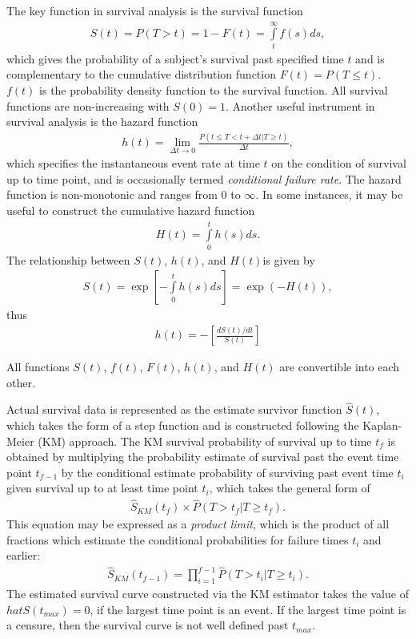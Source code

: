\documentclass[main.tex]{subfiles}
\begin{document}
The key function in survival analysis is the survival function
\begin{align}
S(t)=P(T>t) = 1-F(t) = \int\limits_t^\infty f(s)ds,
\end{align}
which gives the probability of a subject's survival past specified time $t$ and is complementary to the cumulative distribution function $F(t)=P(T \leq t)$. $f(t)$ is the probability density function to the survival function. All survival functions are non-increasing with $S(0)=1$. Another useful instrument in survival analysis is the hazard function
\begin{align}
h(t)=\lim_{\Delta t \to 0}\frac{P(t\leq T < t + \Delta t|T \geq t)}{\Delta t},
\end{align}
which specifies the instantaneous event rate at time $t$ on the condition of survival up to time point, and is occasionally termed \textit{conditional failure rate}. The hazard function is non-monotonic and ranges from $0$ to $\infty$. In some instances, it may be useful to construct the cumulative hazard function
\begin{align}
H(t)=\int\limits_0^t h(s)ds.
\end{align}
The relationship between $S(t)$, $h(t)$, and $H(t) $is given by
\begin{align}
S(t)=\exp{\left[-\int\limits_0^t h(s)ds\right]}=\exp{(-H(t))},
\end{align}
thus
\begin{align}\label{hazardtosurvival}
h(t) = -\left[\frac{dS(t)/dt}{S(t)}\right]
\end{align}

All functions $S(t)$, $f(t)$, $F(t)$, $h(t)$, and $H(t)$ are convertible into each other. 

Actual survival data is represented as the estimate survivor function $\hat{S}(t)$, which takes the form of a step function and is constructed following the Kaplan-Meier (KM) approach. The KM survival probability of survival up to time $t_f$ is obtained by multiplying the probability estimate of survival past the event time point $t_{f-1}$ by the conditional estimate probability of surviving past event time $t_i$ given survival up to at least time point $t_i$, which takes the general form of
\begin{align}
\hat{S}_{KM}(t_f)\times \hat{P}(T > t_f | T \geq t_f).
\end{align}
This equation may be expressed as a \textit{product limit}, which is the product of all fractions which estimate the conditional probabilities for failure times $t_i$ and earlier:
\begin{align}
\hat{S}_{KM}(t_{f-1})=\prod_{i=1}^{f-1}\hat{P} (T>t_{i}|T\geq t_{i}).
\end{align}
The estimated survival curve constructed via the KM estimator takes the value of $hat{S}(t_{max})=0$, if the largest time point is an event. If the largest time point is a censure, then the survival curve is not well defined past $t_{max}$. 
\end{document}
